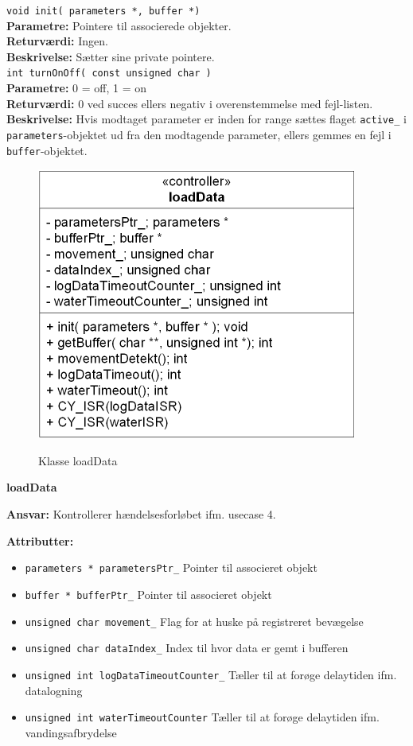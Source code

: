 \verb+void init( parameters *, buffer *)+\\
\textbf{Parametre:} Pointere til associerede objekter. \\
\textbf{Returværdi:} Ingen. \\
\textbf{Beskrivelse:} Sætter sine private pointere. \\

\verb+int turnOnOff( const unsigned char )+ \\
\textbf{Parametre:} 0 = off, 1 = on \\
\textbf{Returværdi:} 0 ved succes ellers negativ i overenstemmelse med fejl-listen. \\
\textbf{Beskrivelse:} Hvis modtaget parameter er inden for range sættes flaget \verb+active_+ i \verb+parameters+-objektet ud fra den modtagende parameter, ellers gemmes en fejl i \verb+buffer+-objektet. \\

\begin{figure}[htbp] \centering
{\includegraphics[scale=1.3]{filer/design/Klassediagrammer/sw_psoc_loadData}}
\caption{Klasse loadData}
\label{fig:sw_psoc_class_loadData}
\end{figure} 

{\centering
\textbf{loadData}\par
}
\textbf{Ansvar:} Kontrollerer hændelsesforløbet ifm. usecase 4. \

\textbf{Attributter:}
\begin{itemize}
	\item \verb+parameters * parametersPtr_+ Pointer til associeret objekt
	\item \verb+buffer * bufferPtr_+ Pointer til associeret objekt
	\item \verb+unsigned char movement_+ Flag for at huske på registreret bevægelse
	\item \verb+unsigned char dataIndex_+ Index til hvor data er gemt i bufferen 
	\item \verb+unsigned int logDataTimeoutCounter_+ Tæller til at forøge delaytiden ifm. datalogning
	\item \verb+unsigned int waterTimeoutCounter+ Tæller til at forøge delaytiden ifm. vandingsafbrydelse
\end{itemize}

